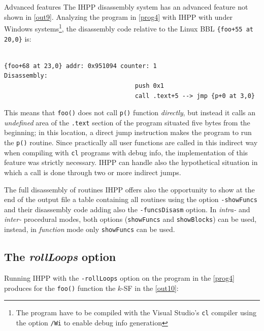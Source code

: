 \documentclass[a4paper,11pt]{report}
\begin{document}
\begin{paragraph}{Advanced features}
The IHPP disassembly system has an advanced feature not shown in \cref{out9}.
Analyzing the program in \cref{prog4} with IHPP with under Windows 
systems\footnote{The program have to be compiled with the Visual Studio's \texttt{cl} 
compiler using the option \texttt{\slash Wi} to enable debug info generation},
the disassembly code relative to the Linux BBL \verb|{foo+55 at 20,0}| is:
\begin{lstlisting}[language={[x86masm]Assembler}, 
	label=out10, caption={an example of an indirect call}, frame=bottomline]

{foo+68 at 23,0} addr: 0x951094 counter: 1	
Disassembly: 
									push 0x1
									call .text+5 --> jmp {p+0 at 3,0}
\end{lstlisting}

This means that \verb|foo()| does not call \verb|p()| function \emph{directly}, 
but instead it calls an \emph{undefined} area of the \verb|.text| section of the program situated five bytes from the beginning; in this location, a direct jump instruction
makes the program to run the \verb|p()| routine. Since practically all user functions
are called in this indirect way when compiling with \verb|cl| programs with debug info,
the implementation of this feature was strictly necessary. IHPP can handle also
the hypothetical situation in which a call is done through two or more indirect jumps.
\end{paragraph}

\begin{paragraph}{The full disassembly of routines}
IHPP offers also the opportunity to show at the end of the output file 
a table containing all routines using the option \verb|-showFuncs| and their 
disassembly code adding also the \verb|-funcsDisasm| option.  
In \emph{intra-} and \emph{inter-} procedural modes, both options (\verb|showFuncs| and \verb|showBlocks|) can be used, instead, in \emph{function} mode only \verb|showFuncs| can be used.
\end{paragraph}

\subsection{The \emph{rollLoops} option}

Running IHPP with the \verb|-rollLoops| option on the program in the \cref{prog4}
produces for the \verb|foo()| function the $k$-SF in the \cref{out10}:
\end{document}
